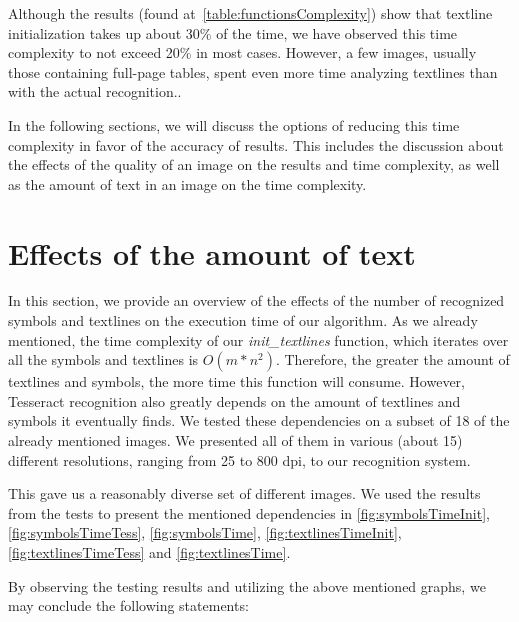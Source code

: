 Although the results (found at~\cref{table:functionsComplexity}) show that textline initialization takes up about 30\% of the time, we have observed this time complexity to not exceed 20\% in most cases. However, a few images, usually those containing full-page tables, spent even more time analyzing textlines than with the actual recognition..

In the following sections, we will discuss the options of reducing this time complexity in favor of the accuracy of results. This includes the discussion about the effects of the quality of an image on the results and time complexity, as well as the amount of text in an image on the time complexity.

\section{Effects of the amount of text} \label{resultsEffectsOfText}

In this section, we provide an overview of the effects of the number of recognized symbols and textlines on the execution time of our algorithm. As we already mentioned, the time complexity of our \emph{init\_textlines} function, which iterates over all the symbols and textlines is $O(m*n^2)$. Therefore, the greater the amount of textlines and symbols, the more time this function will consume. However, Tesseract recognition also greatly depends on the amount of textlines and symbols it eventually finds. We tested these dependencies on a subset of 18 of the already mentioned images. We presented all of them in various (about 15) different resolutions, ranging from 25 to 800 dpi, to our recognition system. 

This gave us a reasonably diverse set of different images. We used the results from the tests to present the mentioned dependencies in \cref{fig:symbolsTimeInit}, \cref{fig:symbolsTimeTess}, \cref{fig:symbolsTime}, \cref{fig:textlinesTimeInit}, \cref{fig:textlinesTimeTess} and \cref{fig:textlinesTime}.

By observing the testing results and utilizing the above mentioned graphs, we may conclude the following statements:

